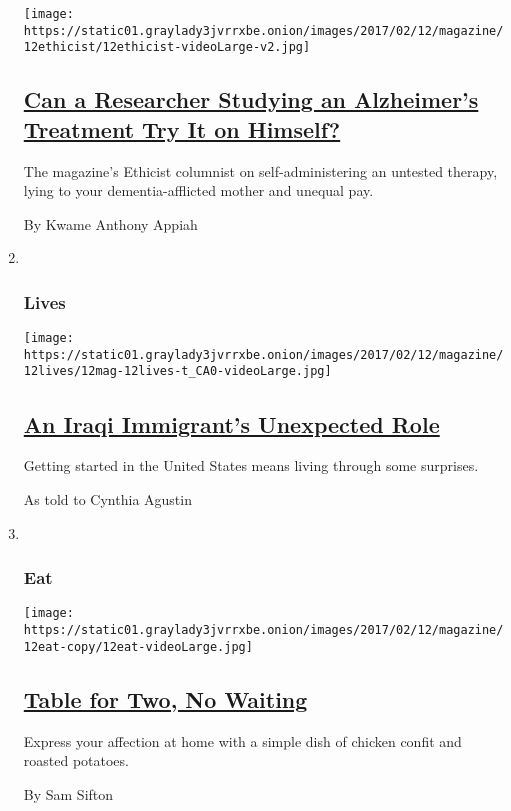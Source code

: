 \begin{enumerate}
  \texttt{[image: https://static01.graylady3jvrrxbe.onion/images/2017/02/12/magazine/12ethicist/12ethicist-videoLarge-v2.jpg]}

  \hypertarget{can-a-researcher-studying-an-alzheimers-treatment-try-it-on-himself}{%
  \subsection{\texorpdfstring{\href{/2017/02/08/magazine/can-a-researcher-studying-an-alzheimers-treatment-try-it-on-himself.html}{Can
  a Researcher Studying an Alzheimer's Treatment Try It on
  Himself?}}{Can a Researcher Studying an Alzheimer's Treatment Try It on Himself?}}\label{can-a-researcher-studying-an-alzheimers-treatment-try-it-on-himself}}

  The magazine's Ethicist columnist on self-administering an untested
  therapy, lying to your dementia-afflicted mother and unequal pay.

  By Kwame Anthony Appiah
\item ~
  \hypertarget{lives}{%
  \subsubsection{Lives}\label{lives}}

  \texttt{[image: https://static01.graylady3jvrrxbe.onion/images/2017/02/12/magazine/12lives/12mag-12lives-t\_CA0-videoLarge.jpg]}

  \hypertarget{an-iraqi-immigrants-unexpected-role}{%
  \subsection{\texorpdfstring{\href{/2017/02/10/magazine/an-iraqi-immigrants-unexpected-role.html}{An
  Iraqi Immigrant's Unexpected
  Role}}{An Iraqi Immigrant's Unexpected Role}}\label{an-iraqi-immigrants-unexpected-role}}

  Getting started in the United States means living through some
  surprises.

  As told to Cynthia Agustin
\item ~
  \hypertarget{eat}{%
  \subsubsection{Eat}\label{eat}}

  \texttt{[image: https://static01.graylady3jvrrxbe.onion/images/2017/02/12/magazine/12eat-copy/12eat-videoLarge.jpg]}

  \hypertarget{table-for-two-no-waiting}{%
  \subsection{\texorpdfstring{\href{/2017/02/09/magazine/table-for-two-no-waiting.html}{Table
  for Two, No
  Waiting}}{Table for Two, No Waiting}}\label{table-for-two-no-waiting}}

  Express your affection at home with a simple dish of chicken confit
  and roasted potatoes.

  By Sam Sifton
\end{enumerate}

